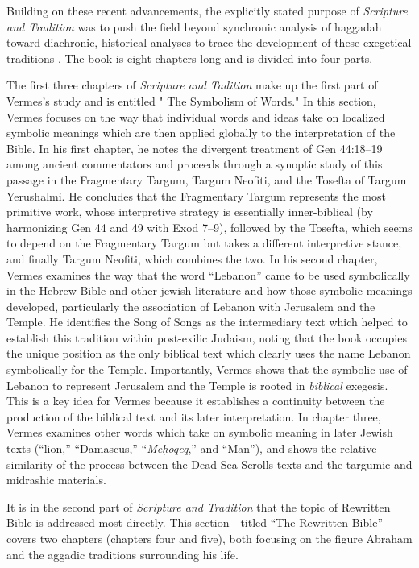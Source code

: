Building on these recent advancements, the explicitly stated purpose of
\emph{Scripture and Tradition} was to push the field beyond synchronic
analysis of haggadah toward diachronic, historical analyses to trace the
development of these exegetical traditions \autocites[1]{vermes1961}[See
also][]{bloch1955_repr}. The book is eight chapters long and is divided
into four parts.

The first three chapters of \emph{Scripture and Tadition} make up the
first part of Vermes's study and is entitled " The Symbolism of Words."
In this section, Vermes focuses on the way that individual words and
ideas take on localized symbolic meanings which are then applied
globally to the interpretation of the Bible. In his first chapter, he
notes the divergent treatment of Gen 44:18--19 among ancient
commentators and proceeds through a synoptic study of this passage in
the Fragmentary Targum, Targum Neofiti, and the Tosefta of Targum
Yerushalmi. He concludes that the Fragmentary Targum represents the most
primitive work, whose interpretive strategy is essentially
inner-biblical (by harmonizing Gen 44 and 49 with Exod 7--9), followed
by the Tosefta, which seems to depend on the Fragmentary Targum but
takes a different interpretive stance, and finally Targum Neofiti, which
combines the two. In his second chapter, Vermes examines the way that
the word ``Lebanon'' came to be used symbolically in the Hebrew Bible
and other jewish literature and how those symbolic meanings developed,
particularly the association of Lebanon with Jerusalem and the Temple.
He identifies the Song of Songs as the intermediary text which helped to
establish this tradition within post-exilic Judaism, noting that the
book occupies the unique position as the only biblical text which
clearly uses the name Lebanon symbolically for the Temple. Importantly,
Vermes shows that the symbolic use of Lebanon to represent Jerusalem and
the Temple is rooted in \emph{biblical} exegesis. This is a key idea for
Vermes because it establishes a continuity between the production of the
biblical text and its later interpretation. In chapter three, Vermes
examines other words which take on symbolic meaning in later Jewish
texts (``lion,'' ``Damascus,'' ``\emph{Meḥoqeq},'' and ``Man''), and
shows the relative similarity of the process between the
Dead Sea Scrolls texts and the targumic and midrashic materials.

It is in the second part of \emph{Scripture and Tradition} that the
topic of Rewritten Bible is addressed most directly. This
section---titled ``The Rewritten Bible''---covers two chapters (chapters
four and five), both focusing on the figure Abraham and the aggadic
traditions surrounding his life.

